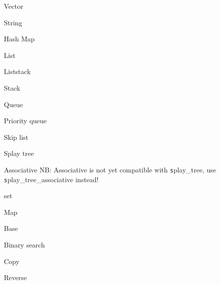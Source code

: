 \begin{algorithm}{Vector}
\end{algorithm}
\begin{algorithm}{String}
\end{algorithm}
\begin{algorithm}{Hash Map}
\end{algorithm}
\begin{algorithm}{List}
\end{algorithm}
\begin{algorithm}{Liststack}
\end{algorithm}
\begin{algorithm}{Stack}
\end{algorithm}
\begin{algorithm}{Queue}
\end{algorithm}
\begin{algorithm}{Priority queue}
\end{algorithm}
\begin{algorithm}{Skip list}
\end{algorithm}
\begin{algorithm}{Splay tree}
\end{algorithm}
\begin{algorithm}{Associative}
NB: Associative is not yet compatible with {\texttt splay_tree}, use
{\texttt splay_tree_associative} instead!
\end{algorithm}
\begin{algorithm}{set}
\end{algorithm}
\begin{algorithm}{Map}
\end{algorithm}
\begin{algorithm}{Base}
\end{algorithm}
\begin{algorithm}{Binary search}
\end{algorithm}
\begin{algorithm}{Copy}
\end{algorithm}
\begin{algorithm}{Reverse}
\end{algorithm}
